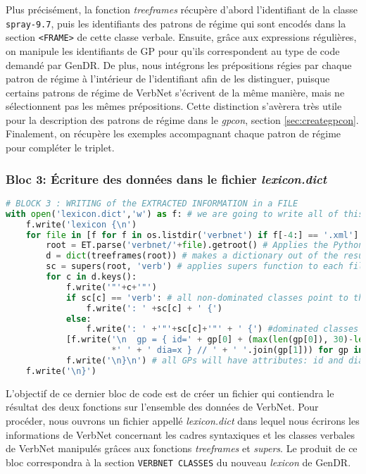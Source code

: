 Plus précisément, la fonction \emph{treeframes} récupère d'abord l'identifiant de la classe \texttt{spray-9.7}, puis les identifiants des patrons de régime qui sont encodés dans la section \texttt{<FRAME>} de cette classe verbale. Ensuite, grâce aux expressions régulières, on manipule les identifiants de \ac{GP} pour qu'ils correspondent au type de code demandé par GenDR. De plus, nous intégrons les prépositions régies par chaque patron de régime à l'intérieur de l'identifiant afin de les distinguer, puisque certains patrons de régime de VerbNet s'écrivent de la même manière, mais ne sélectionnent pas les mêmes prépositions. Cette distinction s'avèrera très utile pour la description des patrons de régime dans le \emph{gpcon}, section \ref{sec:creategpcon}. Finalement, on récupère les exemples accompagnant chaque patron de régime pour compléter le triplet.

\subsubsection{Bloc 3: Écriture des données dans le fichier \emph{lexicon.dict}}

\begin{lstlisting}[language=Python, caption = Écritures des données dans le fichier \emph{lexicon.dict}, label=fig:archivn-bloc3]		
# BLOCK 3 : WRITING of the EXTRACTED INFORMATION in a FILE
with open('lexicon.dict','w') as f: # we are going to write all of this block into lexicon.dict
    f.write('lexicon {\n')
    for file in [f for f in os.listdir('verbnet') if f[-4:] == '.xml']: # open VerbNet XMl files
        root = ET.parse('verbnet/'+file).getroot() # Applies the Python Element Tree module
        d = dict(treeframes(root)) # makes a dictionary out of the results of treeframes on a file
        sc = supers(root, 'verb') # applies supers function to each file
        for c in d.keys():
            f.write('"'+c+'"')
            if sc[c] == 'verb': # all non-dominated classes point to the default verb class
                f.write(': ' +sc[c] + ' {') 
            else:
                f.write(': ' +'"'+sc[c]+'"' + ' {') #dominated classes point towards their governor
            [f.write('\n  gp = { id=' + gp[0] + (max(len(gp[0]), 30)-len(gp[0]))
                     *' ' + ' dia=x } // ' + ' '.join(gp[1])) for gp in d[c]]
            f.write('\n}\n') # all GPs will have attributes: id and dia
    f.write('\n}')
\end{lstlisting}

L'objectif de ce dernier bloc de code est de créer un fichier qui contiendra le résultat des deux fonctions sur l'ensemble des données de VerbNet. Pour procéder, nous ouvrons un fichier appellé \emph{lexicon.dict} dans lequel nous écrirons les informations de VerbNet concernant les cadres syntaxiques et les classes verbales de VerbNet manipulés grâces aux fonctions \emph{treeframes} et \emph{supers}. Le produit de ce bloc correspondra à la section \texttt{VERBNET CLASSES} du nouveau \emph{lexicon} de GenDR.

